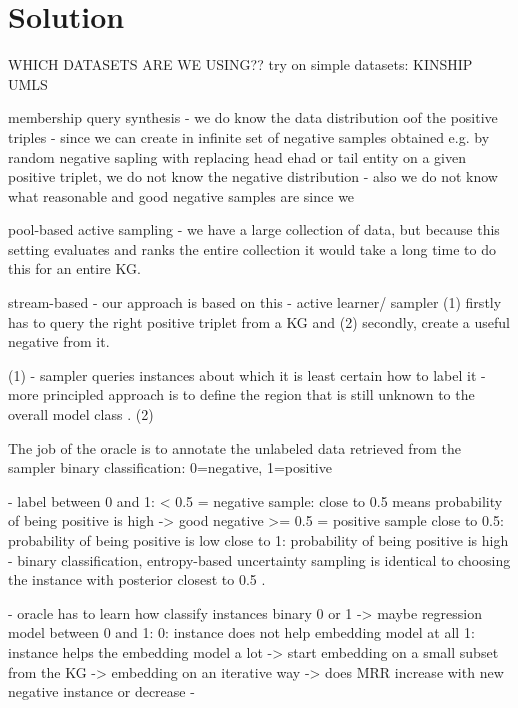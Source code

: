 \chapter{Solution}
\label{ch:solution}




WHICH DATASETS ARE WE USING??
try on simple datasets:
KINSHIP
UMLS



membership query synthesis
- we do know the data distribution oof the positive triples
- since we can create in infinite set of negative samples obtained e.g. by random negative sapling with replacing head ehad or tail entity on a given positive triplet, we do not know the negative distribution
- also we do not know what reasonable and good negative samples are since we 



pool-based active sampling
- we have a large collection of data, but because this setting evaluates and ranks the entire collection
it would take a long time to do this for an entire \ac{KG}.


stream-based
- our approach is based on this
- active learner/ sampler 
(1) firstly has to query the right positive triplet from a \ac{KG} and 
(2) secondly, create a useful negative from it.

(1) 
- sampler queries instances about which it is least certain how to label it
- more principled approach is to define the region that is still unknown to
the overall model class \cite{Settles2009ActiveLL}.
(2)

The job of the oracle is to annotate the unlabeled data retrieved from the sampler
binary classification: 0=negative, 1=positive


- label between 0 and 1:
< 0.5 = negative sample: 
close to 0.5 means probability of being positive is high -> good negative
>= 0.5 = positive sample
close to 0.5: probability of being positive is low
close to 1: probability of being positive is high
- binary classification, entropy-based uncertainty sampling is identical to choosing the instance with posterior closest to 0.5 \cite{Settles2009ActiveLL}.

- oracle has to learn how classify instances binary 0 or 1
-> maybe regression model between 0 and 1:
0: instance does not help embedding model at all
1: instance helps the embedding model a lot
-> start embedding on a small subset from the KG
-> embedding on an iterative way -> does MRR increase with new negative instance or decrease
- 

